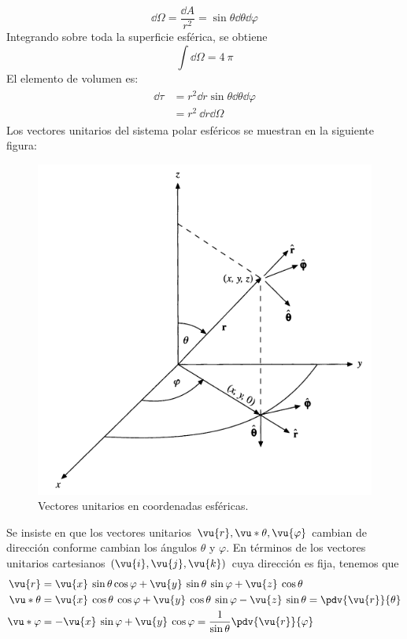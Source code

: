 \[ \dd{\Omega} = \dfrac{\dd{A}}{r^{2}} = \sin \theta \dd{\theta} \dd{\varphi} \]
Integrando sobre toda la superficie esférica, se obtiene
\[ \int \dd{\Omega} = 4 \: \pi \]
El elemento de volumen es:
\begin{align*}
\begin{aligned}
\dd{\tau} &= r^{2} \dd{r} \sin \theta \dd{\theta} \dd{\varphi} \\
&= r^{2} \: \dd{r} \dd{\Omega}
\end{aligned}
\end{align*}
Los vectores unitarios del sistema polar esféricos se muestran en la siguiente figura:
\begin{figure}[H]
    \centering
    \includegraphics[scale=0.4]{Imagenes/CoordenadasEsfericasVectoresUnitarios.png}
    \caption{Vectores unitarios en coordenadas esféricas.}
\end{figure}
Se insiste en que los vectores unitarios $\vu{r}, \vu*{\theta}, \vu{\varphi}$ cambian de dirección conforme cambian los ángulos $\theta$ y $\varphi$. En términos de los vectores unitarios cartesianos $(\vu{i},\vu{j},\vu{k})$ cuya dirección es fija, tenemos que
\begin{align}
\begin{aligned}
\vu{r} &= \vu{x} \: \sin \theta \cos \varphi + \vu{y} \: \sin \theta \: \sin \varphi + \vu{z} \: \cos \theta \\
\vu*{\theta} &= \vu{x} \: \cos \theta \: \cos \varphi + \vu{y} \: \cos \theta \: \sin \varphi - \vu{z} \: \sin \theta = \pdv{\vu{r}}{\theta} \\
\vu*{\varphi} &= - \vu{x} \: \sin \varphi + \vu{y} \: \cos \varphi = \dfrac{1}{\sin \theta} \pdv{\vu{r}}{\varphi}
\end{aligned}
\end{align}
